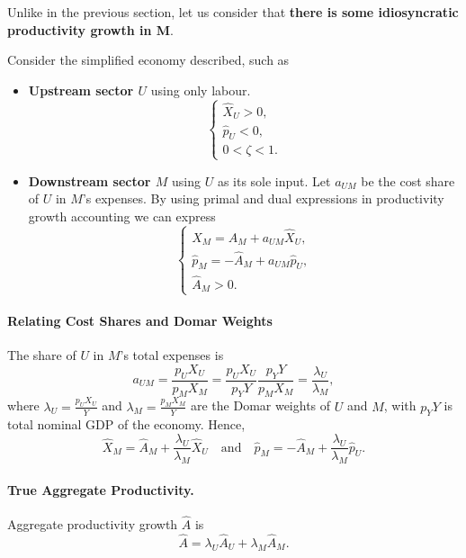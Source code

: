 \documentclass[11pt]{article}
\begin{document}
Unlike in the previous section, let us consider that \textbf{there is some idiosyncratic productivity growth in M}.

Consider the simplified economy described, such as
\begin{itemize}
    \item \textbf{Upstream sector $U$} using only labour. 
    \[
    \begin{cases}
    \hat{X}_U > 0,\\
    \hat{p}_U < 0,\\
    0 < \zeta < 1.
    \end{cases}
    \]
    \item \textbf{Downstream sector $M$} using $U$ as its sole input. Let $a_{UM}$ be the cost share of $U$ in $M$'s expenses.  By using primal and dual expressions in productivity growth accounting we can express
    \[
    \begin{cases}
    \hat{X}_M = \hat{A}_M+a_{UM}  \hat{X}_U,\\
    \hat{p}_M = -\hat{A}_M+a_{UM}  \hat{p}_U,\\
    \hat{A}_M > 0.
    \end{cases}
    \]
\end{itemize}

\paragraph{Relating Cost Shares and Domar Weights}
The share of $U$ in $M$'s total expenses is
\begin{equation*}
     a_{UM}  =  \frac{p_U X_U}{p_M X_M}  =  \frac{p_U X_U}{p_Y Y} \frac{p_Y Y}{p_M X_M} 
     =  \frac{\lambda_U}{\lambda_M},
\end{equation*}
where $\lambda_U = \tfrac{p_U X_U}{Y}$ and $\lambda_M = \tfrac{p_M X_M}{Y}$ are the Domar weights of $U$ and $M$, with $p_Y Y$ is total nominal GDP of the economy. Hence, 
\begin{equation*}
    \hat{X}_M = \hat{A}_M+\frac{\lambda_U}{\lambda_M} \hat{X}_U
    \quad\text{and}\quad
    \hat{p}_M = -\hat{A}_M+\frac{\lambda_U}{\lambda_M} \hat{p}_U.
\end{equation*}

\paragraph{True Aggregate Productivity.}
Aggregate productivity growth $\hat{A}$ is 
\begin{equation}
      \hat{A} 
     =  
    \lambda_U  \hat{A}_U  +  \lambda_M  \hat{A}_M.
\end{equation}
\end{document}

